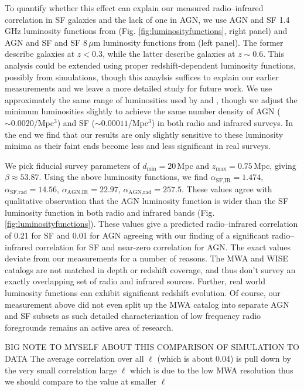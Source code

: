 \documentclass{emulateapj}
\newcommand{\mintext}{\text{min}}
\newcommand{\maxtext}{\text{max}}
\begin{document}
To quantify whether this effect can explain our measured radio--infrared correlation in SF galaxies and the lack of one in AGN, we use AGN and SF 1.4\,GHz luminosity functions from \citet{mauch07} (Fig. \ref{fig:luminosityfunctions}, right panel) and AGN and SF and SF 8\,$\mu$m luminosity functions from \citet{fu10} (left panel). The former describe galaxies at $z<0.3$, while the latter describe galaxies at $z\sim0.6$. This analysis could be extended using proper redshift-dependent luminosity functions, possibly from simulations, though this anaylsis suffices to explain our earlier measurements and we leave a more detailed study for future work. We use approximately the same range of luminosities used by \citet{mauch07} and \citet{fu10}, though we adjust the minimum luminosities slightly to achieve the same number density of AGN ($\sim0.0020$/Mpc$^3$) and SF ($\sim0.00011$/Mpc$^3$) in both radio and infrared surveys. In the end we find that our results are only slightly sensitive to these luminosity minima as their faint ends become less and less significant in real surveys. 

We pick fiducial survey parameters of $d_\mintext=20$\,Mpc and $z_\maxtext=0.75$\,Mpc, giving $\beta\approx53.87$.  Using the above luminosity functions, we find $\alpha_{\text{SF,IR}}=1.474$, $\alpha_{\text{SF,rad}}=14.56$, $\alpha_{\text{AGN,IR}}=22.97$, $\alpha_{\text{AGN,rad}}=257.5$. These values agree with qualitative observation that the AGN luminosity function is wider than the SF luminosity function in both radio and infrared bands (Fig. \ref{fig:luminosityfunctions}). These values give a predicted radio--infrared correlation of 0.21 for SF and 0.01 for AGN agreeing with our finding of a significant radio--infrared correlation for SF and near-zero correlation for AGN. The exact values deviate from our measurements for a number of reasons. The MWA and WISE catalogs are not matched in depth or redshift coverage, and thus don't survey an exactly overlapping set of radio and infrared sources. Further, real world luminosity functions can exhibit significant redshift evolution. Of course, our measurement above did not even split up the MWA catalog into separate AGN and SF subsets as such detailed characterization of low frequency radio foregrounds remains an active area of research. 

BIG NOTE TO MYSELF ABOUT THIS COMPARISON OF SIMULATION TO DATA The average correlation over all $\ell$ (which is about 0.04) is pull down by the very small correlation large $\ell$ which is due to the low MWA resolution thus we should compare to the value at smaller $\ell$
\end{document}
